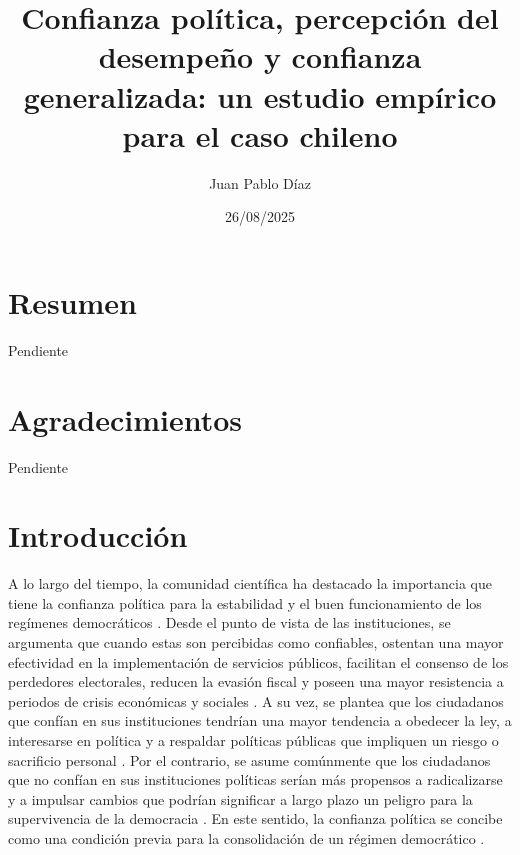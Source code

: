 \documentclass[12pt,twoside]{templates/facsothesis}
\title{Confianza política, percepción del desempeño y confianza generalizada: un estudio empírico para el caso chileno}
\author{Juan Pablo Díaz}
\date{26/08/2025}
\begin{document}

  \maketitle

\frontmatter %
\pagestyle{empty} %



  \setcounter{tocdepth}{1}
  \setlength{\parskip}{0pt}
  \tableofcontents

\setlength\parskip{1em plus 0.1em minus 0.2em}

  \listoftables

  \listoffigures



\mainmatter %
\pagestyle{fancyplain} %

\chapter*{Resumen}\label{resumen}

Pendiente

\chapter*{Agradecimientos}\label{agradecimientos}

Pendiente

\chapter{Introducción}\label{introducciuxf3n}

A lo largo del tiempo, la comunidad científica ha destacado la importancia que tiene la confianza política para la estabilidad y el buen funcionamiento de los regímenes democráticos \citep{zmerliPoliticalTrust2022}. Desde el punto de vista de las instituciones, se argumenta que cuando estas son percibidas como confiables, ostentan una mayor efectividad en la implementación de servicios públicos, facilitan el consenso de los perdedores electorales, reducen la evasión fiscal y poseen una mayor resistencia a periodos de crisis económicas y sociales \citep{vandermeerDeeplyRootedConcern2017, newtonSocialPoliticalTrust2017, citrinPoliticalTrustCynical2018}. A su vez, se plantea que los ciudadanos que confían en sus instituciones tendrían una mayor tendencia a obedecer la ley, a interesarse en política y a respaldar políticas públicas que impliquen un riesgo o sacrificio personal \citep{citrinPoliticalTrustCynical2018, zmerliPoliticalTrust2022}. Por el contrario, se asume comúnmente que los ciudadanos que no confían en sus instituciones políticas serían más propensos a radicalizarse y a impulsar cambios que podrían significar a largo plazo un peligro para la supervivencia de la democracia \citep{andersonSensitiveLeftImpervious2008}. En este sentido, la confianza política se concibe como una condición previa para la consolidación de un régimen democrático \citep{vandermeerDeeplyRootedConcern2017}.
\end{document}

